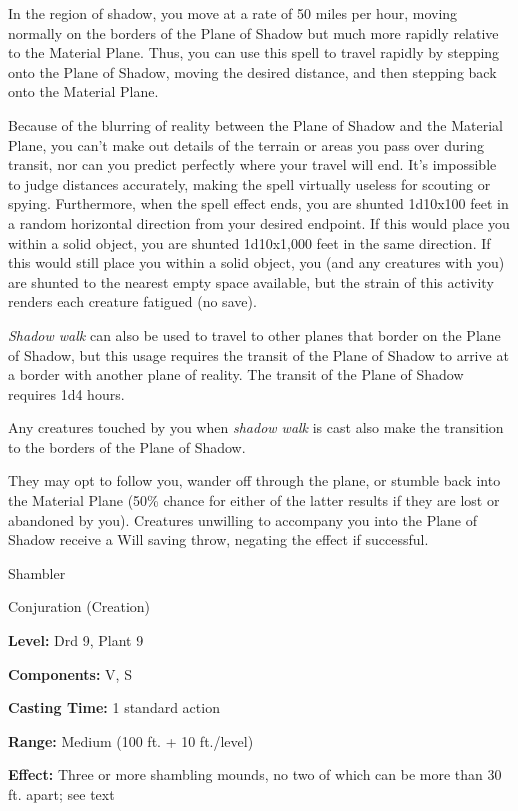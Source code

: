 \documentclass{article}
\begin{document}
In the region of shadow, you move at a rate of 50 miles per hour, moving normally 
on the borders of the Plane of Shadow but much more rapidly relative to the Material 
Plane. Thus, you can use this spell to travel rapidly by stepping onto the Plane 
of Shadow, moving the desired distance, and then stepping back onto the Material 
Plane.

Because of the blurring of reality between the Plane of Shadow and the Material 
Plane, you can't make out details of the terrain or areas you pass over during 
transit, nor can you predict perfectly where your travel will end. It's impossible 
to judge distances accurately, making the spell virtually useless for scouting 
or spying. Furthermore, when the spell effect ends, you are shunted 1d10x100 feet 
in a random horizontal direction from your desired endpoint. If this would place 
you within a solid object, you are shunted 1d10x1,000 feet in the same direction. 
If this would still place you within a solid object, you (and any creatures with 
you) are shunted to the nearest empty space available, but the strain of this activity 
renders each creature fatigued (no save).

\textit{Shadow walk }can also be used to travel to other planes that border on 
the Plane of Shadow, but this usage requires the transit of the Plane of Shadow 
to arrive at a border with another plane of reality. The transit of the Plane of 
Shadow requires 1d4 hours.

Any creatures touched by you when \textit{shadow walk }is cast also make the transition 
to the borders of the Plane of Shadow.

They may opt to follow you, wander off through the plane, or stumble back into 
the Material Plane (50\% chance for either of the latter results if they are lost 
or abandoned by you). Creatures unwilling to accompany you into the Plane of Shadow 
receive a Will saving throw, negating the effect if successful.

\vspace{12pt}
Shambler

Conjuration (Creation)

\textbf{Level:} Drd 9, Plant 9

\textbf{Components:} V, S

\textbf{Casting Time:} 1 standard action

\textbf{Range: }Medium (100 ft. + 10 ft./level)

\textbf{Effect:} Three or more shambling mounds, no two of which can be more than 
30 ft. apart; see text
\end{document}
